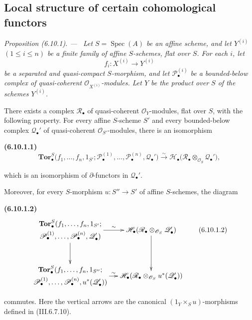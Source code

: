 \documentclass[10pt,oneside]{book}
\newcommand{\sh}[1]{\mathscr{#1}}
\newcommand{\Spec}{\operatorname{Spec}}
\newcommand{\sref}[2][]{(#2)}
\newenvironment{env}[1][]{\par\medskip\noindent\textbf{(#1)}\ }{\par}
\newenvironment{proposition}[1][]{\par\medskip\noindent\itshape Proposition (#1). ---\ }{\par}
\begin{document}
\subsection{Local structure of certain cohomological functors}
\label{subsection:III.6.10}
\label{III.6.10}

\begin{proposition}[6.10.1]
\label{III.6.10.1}
Let $S=\Spec(A)$ be an affine scheme, and let
$Y^{(i)}$ $(1\leq i\leq n)$ be a finite family of affine
$S$-schemes, flat over $S$.  For each $i$, let
\[
  f_i:X^{(i)}\longrightarrow Y^{(i)}
\]
be a separated and quasi-compact $S$-morphism, and let
$\sh P_\bullet^{(i)}$ be a bounded-below complex of
quasi-coherent $\sh O_{X^{(i)}}$-modules.  Let $Y$ be the product
over $S$ of the schemes $Y^{(i)}$.

There exists a complex $\sh R_\bullet$ of quasi-coherent
$\sh O_Y$-modules, flat over $S$, with the following property.
For every affine $S$-scheme $S'$ and every bounded-below complex
$\sh Q_\bullet'$ of quasi-coherent $\sh O_{S'}$-modules, there is
an isomorphism
\begin{env}[6.10.1.1]
\label{III.6.10.1.1}
\[
  \mathbf{Tor}_\bullet^S
  \bigl(
    f_1,\ldots,f_n,1_{S'};
    \sh P_\bullet^{(1)},\ldots,\sh P_\bullet^{(n)},
    \sh Q_\bullet'
  \bigr)
  \xrightarrow{\sim}
  \sh H_\bullet
  \bigl(
    \sh R_\bullet\otimes_{\sh O_S}\sh Q_\bullet'
  \bigr),
  \tag{6.10.1.1}\label{III.6.10.1.1.eq}
\]
\end{env}
which is an isomorphism of $\partial$-functors in
$\sh Q_\bullet'$.

Moreover, for every $S$-morphism
$u:S''\to S'$ of affine $S$-schemes, the diagram
\begin{env}[6.10.1.2]
\label{III.6.10.1.2}
\[
\xymatrix@C=12pt@R=30pt{
  {\begin{gathered}
    \mathbf{Tor}_\bullet^S
    (f_1,\ldots,f_n,1_{S'};\\
    \sh P_\bullet^{(1)},\ldots,\sh P_\bullet^{(n)},
    \sh Q_\bullet')
  \end{gathered}}
  \ar[r]^-{\sim}\ar[d]
  &
  {\sh H_\bullet
    (\sh R_\bullet\otimes_{\sh O_S}\sh Q_\bullet')}
  \ar[d]
  \\
  {\begin{gathered}
    \mathbf{Tor}_\bullet^S
    (f_1,\ldots,f_n,1_{S''};\\
    \sh P_\bullet^{(1)},\ldots,\sh P_\bullet^{(n)},
    u^*(\sh Q_\bullet'))
  \end{gathered}}
  \ar[r]^-{\sim}
  &
  {\sh H_\bullet
    (\sh R_\bullet\otimes_{\sh O_S}u^*(\sh Q_\bullet'))}
}
\tag{6.10.1.2}\label{III.6.10.1.2.eq}
\]
\end{env}
commutes.  Here the vertical arrows are the canonical
$(1_Y\times_Su)$-morphisms defined in \sref{III.6.7.10}.
\end{proposition}
\end{document}
